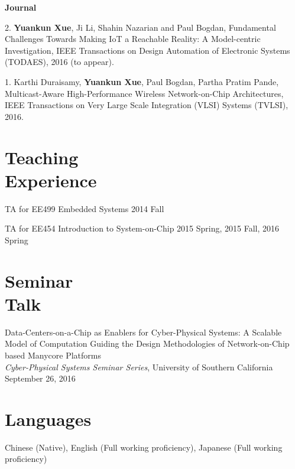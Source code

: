 \documentclass[margin,line]{cv}
\begin{document}
\begin{resume}
\begin{list}{*}{}
    \end{list}
    \textbf{Journal} \\
    \begin{list}{*}{}
    \item [2.] \textbf{Yuankun Xue}, Ji Li, Shahin Nazarian and Paul Bogdan, Fundamental Challenges Towards Making IoT a Reachable Reality: A Model-centric Investigation, IEEE Transactions on Design Automation of Electronic Systems (TODAES), 2016 (to appear).
    
\item [1.] Karthi Duraisamy, \textbf{Yuankun Xue}, Paul Bogdan, Partha Pratim Pande, Multicast-Aware High-Performance Wireless Network-on-Chip Architectures, IEEE Transactions on Very Large Scale Integration (VLSI) Systems (TVLSI), 2016.
    	
    \end{list}
    \section{\mysidestyle Teaching\\Experience}

    TA for EE499 Embedded Systems \hfill  2014 Fall
    
TA for EE454 Introduction to System-on-Chip \hfill 2015 Spring, 2015 Fall, 2016 Spring \\

    \section{\mysidestyle Seminar\\Talk}
    
    Data-Centers-on-a-Chip as Enablers for Cyber-Physical Systems: A Scalable Model of Computation Guiding the Design Methodologies of Network-on-Chip based Manycore Platforms\\
    \textit{Cyber-Physical Systems Seminar Series}, University of Southern California\\
    September 26, 2016

    
    
    \section{\mysidestyle Languages\\}
    Chinese (Native), English (Full working proficiency), Japanese (Full working proficiency)
\end{resume}
\end{document}
